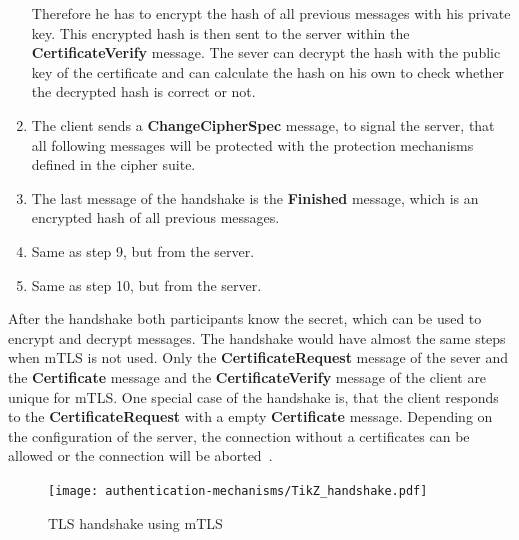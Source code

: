 \begin{enumerate}
		Therefore he has to encrypt the hash of all previous messages with his private key.
		This encrypted hash is then sent to the server within the \textbf{CertificateVerify} message.
		The sever can decrypt the hash with the public key of the certificate and can calculate the hash on his own to check whether the decrypted hash is correct or not.
	\item The client sends a \textbf{ChangeCipherSpec} message, to signal the server, that all following messages will be protected with the protection mechanisms defined in the cipher suite.
	\item The last message of the handshake is the \textbf{Finished} message, which is an encrypted hash of all previous messages.
	\item Same as step 9, but from the server.
	\item Same as step 10, but from the server.
\end{enumerate}
After the handshake both participants know the secret, which can be used to encrypt and decrypt messages.
The handshake would have almost the same steps when mTLS is not used.
Only the \textbf{CertificateRequest} message of the sever and the \textbf{Certificate} message and the \textbf{CertificateVerify} message of the client are unique for mTLS.
One special case of the handshake is, that the client responds to the \textbf{CertificateRequest} with a empty \textbf{Certificate} message.
Depending on the configuration of the server, the connection without a certificates can be allowed or the connection will be aborted~\cite{parsovs2013practical}.

\begin{figure}
    \centering
	\texttt{[image: authentication-mechanisms/TikZ\_handshake.pdf]}
    \caption{TLS handshake using mTLS~\cite{parsovs2013practical}}
	\label{fig:tlshandshake}
\end{figure}

%

